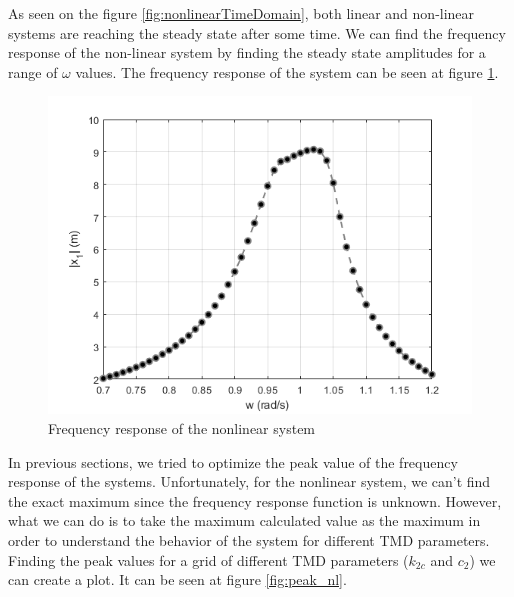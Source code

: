 As seen on the figure \ref{fig:nonlinearTimeDomain}, both linear and non-linear systems are reaching the steady state after some time. We can find the frequency response of the non-linear system by finding the steady state amplitudes for a range of $ \omega $ values. The frequency response of the system can be seen at figure \ref{fig:freq_nlTMD}.
\begin{figure}[ht]
    \centering
    \includegraphics[scale=0.6]{MATLAB Figures/nonlinear stiffness.png}
    \caption{Frequency response of the nonlinear system}
    \label{fig:freq_nlTMD}
\end{figure}
\par In previous sections, we tried to optimize the peak value of the frequency response of the systems. Unfortunately, for the nonlinear system, we can't find the exact maximum since the frequency response function is unknown. However, what we can do is to take the maximum calculated value as the maximum in order to understand the behavior of the system for different TMD parameters. Finding the peak values for a grid of different TMD parameters ($k_{2c}$ and $c_2$) we can create a plot. It can be seen at figure \ref{fig:peak_nl}.\\
